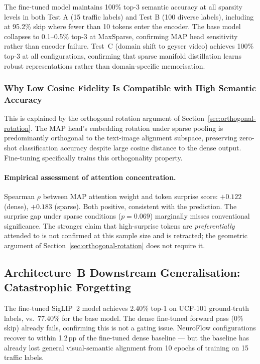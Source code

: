 \documentclass{article}
\begin{document}
The fine-tuned model maintains 100\% top-3 semantic accuracy at all
sparsity levels in both Test A (15 traffic labels) and Test B (100
diverse labels), including at 95.2\% skip where fewer than 10 tokens
enter the encoder. The base model collapses to 0.1--0.5\% top-3 at
MaxSparse, confirming MAP head sensitivity rather than encoder failure.
Test~C (domain shift to geyser video) achieves 100\% top-3 at all
configurations, confirming that sparse manifold distillation learns
robust representations rather than domain-specific memorisation.

\subsubsection{Why Low Cosine Fidelity Is Compatible with High Semantic Accuracy}

This is explained by the orthogonal rotation argument of
Section~\ref{sec:orthogonal-rotation}. The MAP head's embedding rotation
under sparse pooling is predominantly orthogonal to the text-image
alignment subspace, preserving zero-shot classification accuracy despite
large cosine distance to the dense output. Fine-tuning specifically
trains this orthogonality property.

\paragraph{Empirical assessment of attention concentration.}
Spearman $\rho$ between MAP attention weight and token surprise score:
$+0.122$ (dense), $+0.183$ (sparse). Both positive, consistent with the
prediction. The surprise gap under sparse conditions ($p = 0.069$)
marginally misses conventional significance. The stronger claim that
high-surprise tokens are \emph{preferentially} attended to is not
confirmed at this sample size and is retracted; the geometric argument
of Section~\ref{sec:orthogonal-rotation} does not require it.

\subsection{Architecture~B Downstream Generalisation: Catastrophic Forgetting}
\label{sec:ucf101-ft-collapse}

The fine-tuned SigLIP~2 model achieves 2.40\% top-1 on UCF-101
ground-truth labels, vs.\ 77.40\% for the base model. The dense
fine-tuned forward pass (0\% skip) already fails, confirming this is
not a gating issue. NeuroFlow configurations recover to within 1.2\,pp
of the fine-tuned dense baseline — but the baseline has already lost
general visual-semantic alignment from 10 epochs of training on 15
traffic labels.
\end{document}
